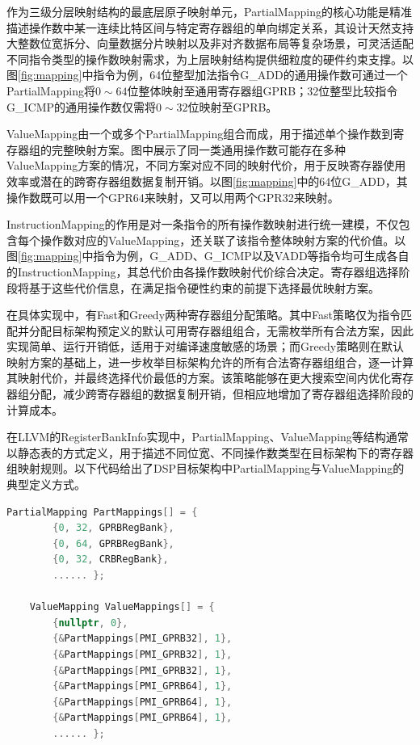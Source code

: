 作为三级分层映射结构的最底层原子映射单元，PartialMapping的核心功能是精准描述操作数中某一连续比特区间与特定寄存器组的单向绑定关系，其设计天然支持大整数位宽拆分、向量数据分片映射以及非对齐数据布局等复杂场景，可灵活适配不同指令类型的操作数映射需求，为上层映射结构提供细粒度的硬件约束支撑。以图\ref{fig:mapping}中指令为例，64位整型加法指令G\_ADD的通用操作数可通过一个PartialMapping将$0\sim64$位整体映射至通用寄存器组GPRB；32位整型比较指令G\_ICMP的通用操作数仅需将$0\sim32$位映射至GPRB。

\par

ValueMapping由一个或多个PartialMapping组合而成，用于描述单个操作数到寄存器组的完整映射方案。图中展示了同一类通用操作数可能存在多种ValueMapping方案的情况，不同方案对应不同的映射代价，用于反映寄存器使用效率或潜在的跨寄存器组数据复制开销。以图\ref{fig:mapping}中的64位G\_ADD，其操作数既可以用一个GPR64来映射，又可以用两个GPR32来映射。

\par

InstructionMapping的作用是对一条指令的所有操作数映射进行统一建模，不仅包含每个操作数对应的ValueMapping，还关联了该指令整体映射方案的代价值。以图\ref{fig:mapping}中指令为例，G\_ADD、G\_ICMP以及VADD等指令均可生成各自的InstructionMapping，其总代价由各操作数映射代价综合决定。寄存器组选择阶段将基于这些代价信息，在满足指令硬性约束的前提下选择最优映射方案。

\par

在具体实现中，有Fast和Greedy两种寄存器组分配策略。其中Fast策略仅为指令匹配并分配目标架构预定义的默认可用寄存器组组合，无需枚举所有合法方案，因此实现简单、运行开销低，适用于对编译速度敏感的场景；而Greedy策略则在默认映射方案的基础上，进一步枚举目标架构允许的所有合法寄存器组组合，逐一计算其映射代价，并最终选择代价最低的方案。该策略能够在更大搜索空间内优化寄存器组分配，减少跨寄存器组的数据复制开销，但相应地增加了寄存器组选择阶段的计算成本。

\par

在LLVM的RegisterBankInfo实现中，PartialMapping、ValueMapping等结构通常以静态表的方式定义，用于描述不同位宽、不同操作数类型在目标架构下的寄存器组映射规则。以下代码给出了DSP目标架构中PartialMapping与ValueMapping的典型定义方式。

\lstset{language=c++}
\begin{lstlisting}[language=C++]
	PartialMapping PartMappings[] = {
		{0, 32, GPRBRegBank},
		{0, 64, GPRBRegBank},
		{0, 32, CRBRegBank},
		...... };
	
	ValueMapping ValueMappings[] = {
		{nullptr, 0},
		{&PartMappings[PMI_GPRB32], 1},
		{&PartMappings[PMI_GPRB32], 1},
		{&PartMappings[PMI_GPRB32], 1},
		{&PartMappings[PMI_GPRB64], 1},
		{&PartMappings[PMI_GPRB64], 1},
		{&PartMappings[PMI_GPRB64], 1},
		...... };
\end{lstlisting}

